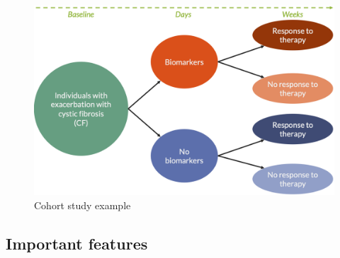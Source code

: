 \documentclass[
]{book}
\begin{document}
\begin{figure}

{\centering \includegraphics[width=1\linewidth]{img/study_design/cohort_study_example} 

}

\caption{Cohort study example}\label{fig:unnamed-chunk-8}
\end{figure}

\hypertarget{important-features}{%
\subsection{Important features}\label{important-features}}
\end{document}
